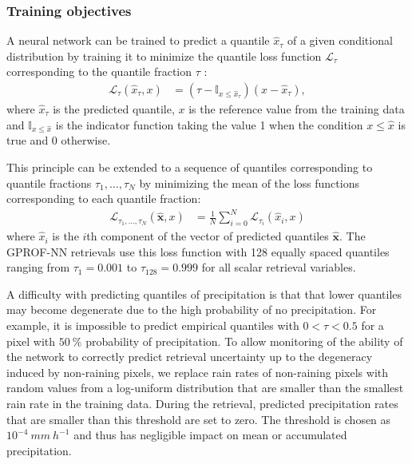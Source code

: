 \documentclass[journal abbreviation, manuscript]{copernicus}
\begin{document}
\subsubsection{Training objectives}
\label{sec:objectives}

A neural network can be trained to predict a quantile $\hat{x}_\tau$ of a given
conditional distribution by training it to minimize the quantile 
loss function $\mathcal{L_\tau}$ corresponding to the quantile
fraction $\tau$ \citep{koenker01}:
\begin{align}\label{eq:quantile_loss}
  \mathcal{L}_\tau(\hat{x}_\tau, x) &= (\tau - \mathbb{I}_{x \leq \hat{x}_\tau})(x
  - \hat{x}_\tau),
\end{align}
where $\hat{x}_\tau$ is the predicted quantile, $x$ is the reference value from the
training data and $\mathbb{I}_{x \leq \hat{x}}$ is the indicator function taking
  the value 1 when the condition $x \leq \hat{x}$ is true and 0 otherwise.

This principle can be extended to a sequence of quantiles corresponding to
quantile fractions $\tau_1, \ldots, \tau_N$ by minimizing the mean of the loss
functions corresponding to each quantile fraction:
\begin{align}\label{eq:loss_function}
  \mathcal{L}_{\tau_1,\ldots, \tau_N}(\hat{\mathbf{x}}, x) &= \frac{1}{N}
  \sum_{i=0}^N
  \mathcal{L}_{\tau_i}(\hat{x}_i, x)
\end{align}
where $\hat{x}_i$ is the $i$th component of the vector of predicted quantiles
$\hat{\mathbf{x}}$. The GPROF-NN retrievals use this loss function with 128
equally spaced quantiles ranging from $\tau_1 = 0.001$ to $\tau_{128} = 0.999$
for all scalar retrieval variables.

A difficulty with predicting quantiles of precipitation is that that lower
quantiles may become degenerate due to the high probability of no precipitation.
For example, it is impossible to predict empirical quantiles with $0 < \tau <
0.5$ for a pixel with $50\ \unit{\%}$ probability of precipitation. To allow
monitoring of the ability of the network to correctly predict retrieval
uncertainty up to the degeneracy induced by non-raining pixels, we replace rain
rates of non-raining pixels with random values from a log-uniform distribution
that are smaller than the smallest rain rate in the training data. During the
retrieval, predicted precipitation rates that are smaller than this threshold
are set to zero. The threshold is chosen as $10^{-4}\ \unit{mm\ h^{-1}}$ and
thus has negligible impact on mean or accumulated precipitation.
\end{document}

